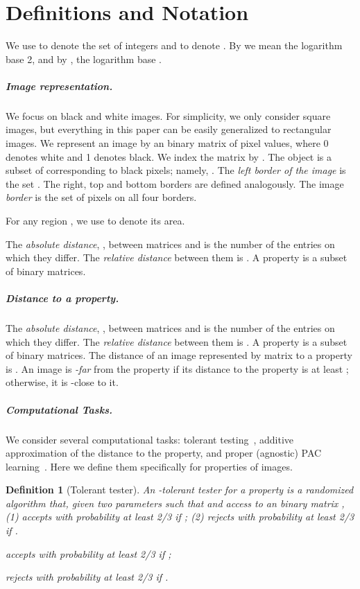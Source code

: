 \documentclass[11pt,english]{article}
\renewenvironment{enumerate}[1]{\begin{compactenum}#1}{\end{compactenum}}
\newtheorem{definition}{Definition}[section]
\numberwithin{figure}{section}
\begin{document}
\section{Definitions and Notation}\label{sec:defintions_notation}
We use  to denote the set of integers  and  to denote .
\ifnum{}
By  we mean the logarithm base 2, and by , the logarithm base .
\fi

\subparagraph{Image representation.}
We focus on black and white images. For simplicity, we only consider square images, but everything in this paper can be easily generalized to rectangular images.
We represent an image by an  binary matrix  of pixel values, where 0 denotes white and 1 denotes black.
We index the matrix by . The object is a subset of 
corresponding to black pixels; namely, .
\ifnum{}
The {\em left border of the image} is the set . The right, top and bottom borders are defined analogously. The image {\em border} is the set of pixels on all four borders.

For any region , we use  to denote its area.
\fi

\ifnum{}
The {\em absolute distance}, , between matrices  and  is the number of the entries on which they differ. The \emph{relative distance} between them is .
A property  is a subset of binary matrices.
\else
\subparagraph{Distance to a property.} The {\em absolute distance}, , between matrices  and  is the number of the entries on which they differ. The \emph{relative distance} between them is .
A property  is a subset of binary matrices. The distance of an image represented by matrix  to a property  is  . An image is {\em -far} from the property if its distance to the property is at least ; otherwise, it is -close to it.

\subparagraph{Computational Tasks.}
We consider several computational tasks: tolerant testing~\cite{PRR06}, additive approximation of the distance to the property, and proper (agnostic) PAC learning~\cite{Valiant84,KearnsSS94,Haussler92}.
\ifnum{}
Here we define them specifically for properties of images.
\fi
\begin{definition}[Tolerant tester]\label{def:tester}
 An {\em -tolerant tester} for a property  is a randomized algorithm that, given two parameters  such that  and access to an  binary matrix ,
\ifnum{}
(1) accepts with probability at least 2/3 if ;
(2) rejects with probability at least 2/3 if .
\else
\begin{enumerate}
\item accepts with probability at least 2/3 if ;
\item rejects with probability at least 2/3 if .
\end{enumerate}
\fi

\end{definition}
\end{document}

